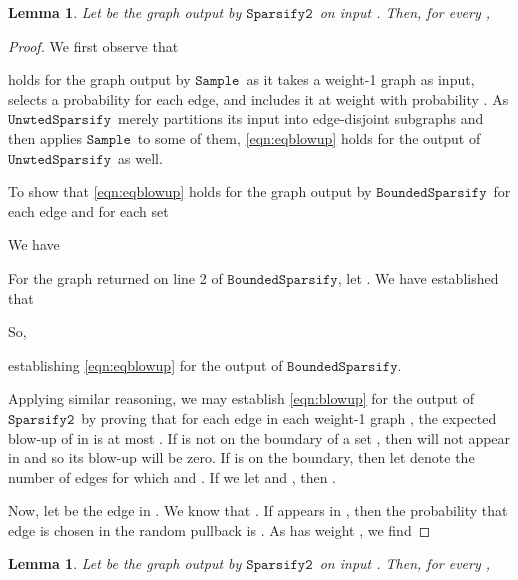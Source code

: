 \documentclass[11pt]{article}
\newtheorem{lemma}[theorem]{Lemma}
\newcommand{\sparsifytwo}{\ensuremath{\mathtt{Sparsify2}}}
\newcommand{\unwtedsparsify}{\ensuremath{\mathtt{UnwtedSparsify}}}
\newcommand{\boundedsparsify}{\ensuremath{\mathtt{BoundedSparsify}}}
\newcommand{\sample}{\ensuremath{\mathtt{Sample}}}
\begin{document}
\begin{lemma}\label{lem:expectedBlowUp}
Let 
  be the graph output by \sparsifytwo \ on input .
Then, for every ,
\end{lemma}
\vspace{-0.2in}


\begin{proof}
We first observe that

 holds for the graph  output
  by \sample \, as it takes a weight-1 graph as input, selects a
  probability  for each edge, and includes it at weight 
  with probability .
As \unwtedsparsify  \ merely partitions its input into edge-disjoint
  subgraphs and then applies \sample \ to some of them, \eqref{eqn:eqblowup}
  holds for the output of \unwtedsparsify \ as well.

To show that \eqref{eqn:eqblowup} holds for the graph output by
  \boundedsparsify \, for each edge  and for each  set

We have

For the graph  returned on line 2 of \boundedsparsify, let
  .
We have established that

So,

establishing \eqref{eqn:eqblowup} for the output of \boundedsparsify .

Applying similar reasoning, we may establish \eqref{eqn:blowup} for
  the output of \sparsifytwo \ by proving that for each edge  in
  each weight-1 graph ,
  the expected blow-up of  in  is at most .
If  is not on the boundary of a set ,
  then  will not appear in  and so its blow-up will be zero.
If  is on the boundary, then let  denote the number
  of edges  for which  and .
If we let  and ,
  then .

Now, let  be the edge  in .
We know that .
If  appears in , then the probability that edge  is chosen
  in the random pullback is .
As  has weight , we find

\end{proof}


\begin{lemma}\label{lem:maxBlowUp}
Let 
  be the graph output by \sparsifytwo \ on input .
Then, for every ,
\end{lemma}
\vspace{-0.2in}
\end{document}

